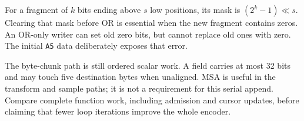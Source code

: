 For a fragment of $k$ bits ending above $s$ low positions, its mask is
$(2^k-1)\ll s$. Clearing that mask before OR is essential when the new fragment
contains zeros. An OR-only writer can set old zero bits, but cannot replace old
ones with zero. The initial \texttt{A5} data deliberately exposes that error.

The byte-chunk path is still ordered scalar work. A field carries at most 32
bits and may touch five destination bytes when unaligned. MSA is useful in the
transform and sample paths; it is not a requirement for this serial append.
Compare complete function work, including admission and cursor updates, before
claiming that fewer loop iterations improve the whole encoder.
